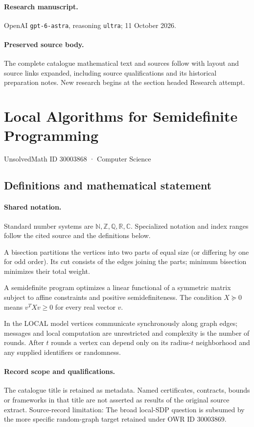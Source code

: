 \documentclass[11pt]{article}
\begin{document}
\paragraph{Research manuscript.} OpenAI \texttt{gpt-6-astra}, reasoning \texttt{ultra}; 11 October 2026.
\paragraph{Preserved source body.} The complete catalogue mathematical text and sources follow with layout and source links expanded, including source qualifications and its historical preparation notes. New research begins at the section headed Research attempt.

\section{Local Algorithms for Semidefinite Programming}\label{30003868}
{\small UnsolvedMath ID 30003868 · Computer Science}
\subsection{Definitions and mathematical statement}

\paragraph{Shared notation.}Standard number systems are $\mathbb N,\mathbb Z,\mathbb Q,\mathbb R,\mathbb C$. Specialized notation and index ranges follow the cited source and the definitions below.


A bisection partitions the vertices into two parts of equal size (or differing by one for odd order). Its cut consists of the edges joining the parts; minimum bisection minimizes their total weight.

A semidefinite program optimizes a linear functional of a symmetric matrix subject to affine constraints and positive semidefiniteness. The condition $X\succeq0$ means $v^TXv\geq0$ for every real vector $v$.

In the LOCAL model vertices communicate synchronously along graph edges; messages and local computation are unrestricted and complexity is the number of rounds. After $t$ rounds a vertex can depend only on its radius-$t$ neighborhood and any supplied identifiers or randomness.
\paragraph{Record scope and qualifications.}
The catalogue title is retained as metadata. Named certificates, contracts, bounds or frameworks in that title are not asserted as results of the original source extract.
Source-record limitation: The broad local-SDP question is subsumed by the more specific random-graph target retained under OWR ID 30003869.
\end{document}
